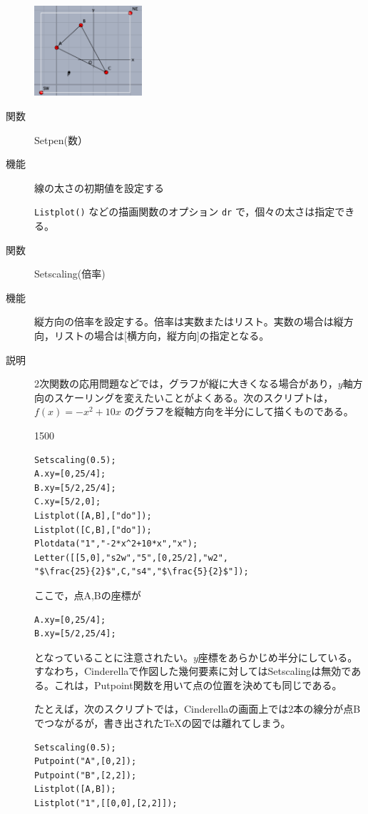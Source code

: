 \documentclass[papersize,a4paper,10pt,uplatex]{jsarticle}
\begin{document}
\begin{description}
\hspace{10mm} \includegraphics[bb=0 0 299.02 250.01, width=4cm]{Fig/setorigin.pdf} 
\hspace{5mm} 

\vspace{\baselineskip}
\hypertarget{setpen}{}
\item[関数]Setpen(数）
\item[機能]線の太さの初期値を設定する

\verb|Listplot()| などの描画関数のオプション \verb|dr| で，個々の太さは指定できる。

\vspace{\baselineskip}
\hypertarget{setscaling}{}
\item[関数]Setscaling(倍率)
\item[機能]縦方向の倍率を設定する。倍率は実数またはリスト。実数の場合は縦方向，リストの場合は[横方向，縦方向]の指定となる。
\item[説明]2次関数の応用問題などでは，グラフが縦に大きくなる場合があり，$y$軸方向のスケーリングを変えたいことがよくある。次のスクリプトは，$f(x)=-x^2+10x$ のグラフを縦軸方向を半分にして描くものである。

\begin{layer}{150}{0}
\end{layer}
\begin{verbatim}
Setscaling(0.5);
A.xy=[0,25/4];
B.xy=[5/2,25/4];
C.xy=[5/2,0];
Listplot([A,B],["do"]);
Listplot([C,B],["do"]);
Plotdata("1","-2*x^2+10*x","x");
Letter([[5,0],"s2w","5",[0,25/2],"w2",
"$\frac{25}{2}$",C,"s4","$\frac{5}{2}$"]);
\end{verbatim}
ここで，点A,Bの座標が
\begin{verbatim}
A.xy=[0,25/4];
B.xy=[5/2,25/4];
\end{verbatim}
となっていることに注意されたい。$y$座標をあらかじめ半分にしている。すなわち，Cinderellaで作図した幾何要素に対してはSetscalingは無効である。これは，Putpoint関数を用いて点の位置を決めても同じである。

たとえば，次のスクリプトでは，Cinderellaの画面上では2本の線分が点Bでつながるが，書き出された\TeX の図では離れてしまう。
\begin{verbatim}
Setscaling(0.5);
Putpoint("A",[0,2]);
Putpoint("B",[2,2]);
Listplot([A,B]);
Listplot("1",[[0,0],[2,2]]);
\end{verbatim}


\end{description}
\end{document}
